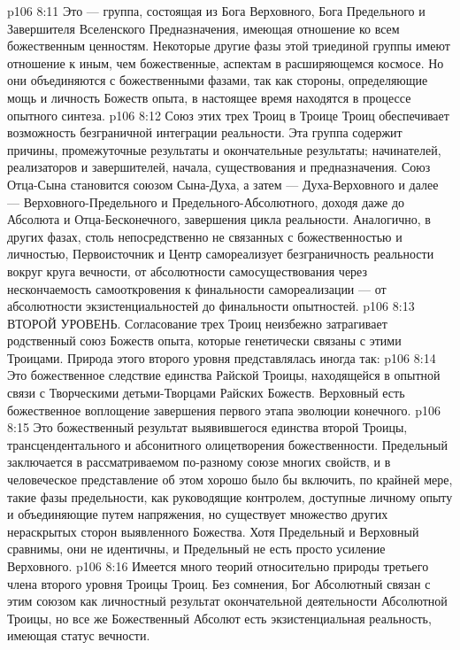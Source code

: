 \vs p106 8:11 \pc {}\bibnobreakspace {} Это --- группа, состоящая из Бога Верховного, Бога Предельного и Завершителя Вселенского Предназначения, имеющая отношение ко всем божественным ценностям. Некоторые другие фазы этой триединой группы имеют отношение к иным, чем божественные, аспектам в расширяющемся космосе. Но они объединяются с божественными фазами, так как стороны, определяющие мощь и личность Божеств опыта, в настоящее время находятся в процессе опытного синтеза.
\vs p106 8:12 \pc Союз этих трех Троиц в Троице Троиц обеспечивает возможность безграничной интеграции реальности. Эта группа содержит причины, промежуточные результаты и окончательные результаты; начинателей, реализаторов и завершителей, начала, существования и предназначения. Союз Отца\hyp{}Сына становится союзом Сына\hyp{}Духа, а затем --- Духа\hyp{}Верховного и далее --- Верховного\hyp{}Предельного и Предельного\hyp{}Абсолютного, доходя даже до Абсолюта и Отца\hyp{}Бесконечного, завершения цикла реальности. Аналогично, в других фазах, столь непосредственно не связанных с божественностью и личностью, Первоисточник и Центр самореализует безграничность реальности вокруг круга вечности, от абсолютности самосуществования через нескончаемость самооткровения к финальности самореализации --- от абсолютности экзистенциальностей до финальности опытностей.
\vs p106 8:13 \pc ВТОРОЙ УРОВЕНЬ. Согласование трех Троиц неизбежно затрагивает родственный союз Божеств опыта, которые генетически связаны с этими Троицами. Природа этого второго уровня представлялась иногда так:
\vs p106 8:14 \bibnobreakspace {} Это божественное следствие единства Райской Троицы, находящейся в опытной связи с Творческими детьми\hyp{}Творцами Райских Божеств. Верховный есть божественное воплощение завершения первого этапа эволюции конечного.
\vs p106 8:15 \pc {}\bibnobreakspace {} Это божественный результат выявившегося единства второй Троицы, трансцендентального и абсонитного олицетворения божественности. Предельный заключается в рассматриваемом по\hyp{}разному союзе многих свойств, и в человеческое представление об этом хорошо было бы включить, по крайней мере, такие фазы предельности, как руководящие контролем, доступные личному опыту и объединяющие путем напряжения, но существует множество других нераскрытых сторон выявленного Божества. Хотя Предельный и Верховный сравнимы, они не идентичны, и Предельный не есть просто усиление Верховного.
\vs p106 8:16 \pc {}\bibnobreakspace {} Имеется много теорий относительно природы третьего члена второго уровня Троицы Троиц. Без сомнения, Бог Абсолютный связан с этим союзом как личностный результат окончательной деятельности Абсолютной Троицы, но все же Божественный Абсолют есть экзистенциальная реальность, имеющая статус вечности.
